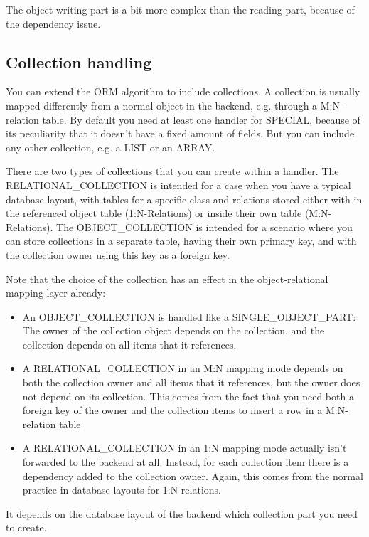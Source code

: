 The object writing part is a bit more complex than the reading part, because of the dependency issue.



\subsection{Collection handling}

You can extend the ORM algorithm to include collections. A collection is usually mapped differently from a normal object in the backend, e.g. through a M:N-relation table.
By default you need at least one handler for SPECIAL, because of its peculiarity that it doesn't have a fixed amount of fields.
But you can include any other collection, e.g. a LIST or an ARRAY.

There are two types of collections that you can create within a handler. 
The RELATIONAL\_COLLECTION is intended for a case when you have a typical database layout, with tables for a specific class and relations stored either with in the referenced object table (1:N-Relations) or inside their own table (M:N-Relations).
The OBJECT\_COLLECTION is intended for a scenario where you can store collections in a separate table, having their own primary key, and with the collection owner using this key as a foreign key.

Note that the choice of the collection has an effect in the object-relational mapping layer already:
\begin{itemize}
 \item An OBJECT\_COLLECTION is handled like a SINGLE\_OBJECT\_PART: The owner of the collection object depends on the collection, and the collection depends on all items that it references.
 \item A RELATIONAL\_COLLECTION in an M:N mapping mode depends on both the collection owner and all items that it references, but the owner does not depend on its collection.
 This comes from the fact that you need both a foreign key of the owner and the collection items to insert a row in a M:N-relation table
\item A RELATIONAL\_COLLECTION in an 1:N mapping mode actually isn't forwarded to the backend at all. Instead, for each collection item there is a dependency added to the collection owner.
 Again, this comes from the normal practice in database layouts for 1:N relations.
\end{itemize}

It depends on the database layout of the backend which collection part you need to create.


